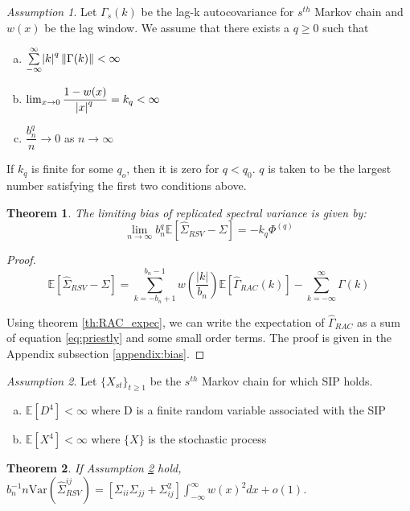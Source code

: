 \documentclass[11pt]{article}
\newcommand{\E}{\mathbb{E}}
\newcommand{\Var}{\text{Var}}
\newtheorem{theorem}{Theorem}
\theoremstyle{remark}
\newtheorem{ass}{Assumption}
\begin{document}
\begin{ass} \label{ass:bias}
    Let $\Gamma_s(k)$ be the lag-k autocovariance for $s^{th}$ Markov chain and $w(x)$ be the lag window. We assume that there exists a $q \geq 0$ such that
    \begin{enumerate} [a.]
        \item $\sum\limits_{-\infty}^{\infty}\abs{k}^q \|\Gamma(k)\| < \infty$
        \item $\lim _{x \to 0}\dfrac{1 - w(x)}{\abs{x}^q} = k_q < \infty$
        \item $\dfrac{b_n^q}{n} \to 0$ as $n \to \infty$
    \end{enumerate}
    
    If $k_q$ is finite for some $q_o$, then it is zero for $q < q_0$. $q$ is taken to be the largest number satisfying the first two conditions above.
\end{ass}


\begin{theorem}\label{th:rsv_bias}
The limiting bias of replicated spectral variance is given by:
\[
 \lim_{n \to \infty}b_n^q\mathbb{E} \left[\hat{\Sigma}_{RSV} - \Sigma \right] = -k_q\Phi^{(q)}
 \]
\end{theorem}

\begin{proof}
\[
\mathbb{E} \left[\hat{\Sigma}_{RSV} - \Sigma \right] = \sum_{k=-b_n+1}^{b_n-1} w\left(\dfrac{|k|}{b_n}\right)\mathbb{E} \left[\hat{\Gamma}_{RAC}(k) \right] - \sum_{k=-\infty}^{\infty}\Gamma(k)
\]

Using theorem \ref{th:RAC_expec}, we can write the expectation of $\hat{\Gamma}_{RAC}$ as  a sum of equation \ref{eq:priestly} and some small order terms.
The proof is given in the Appendix subsection \ref{appendix:bias}.
\end{proof}


\begin{ass} \label{ass:variance_cal}
Let $\{X_{st}\}_{t \geq 1}$ be the $s^{th}$ Markov chain for which SIP holds. 
\begin{enumerate}[a.]
    \item $\E[D^4] < \infty$ where D is a finite random variable associated with the SIP
    \item $\E[X^4] < \infty$ where $\{X\}$ is the stochastic process
\end{enumerate}
\end{ass}


\begin{theorem} \label{th:rsv_variance}
 If Assumption \ref{ass:variance_cal} hold, $b_n^{-1}{n}\Var \left(\hat{\Sigma}_{RSV}^{ij} \right) = [\Sigma_{ii}\Sigma_{jj} + \Sigma_{ij}^2]\int_{-\infty}^{\infty}w(x)^2dx  + o(1)$.
\end{theorem}
\end{document}
